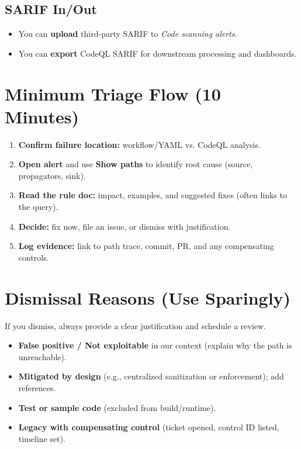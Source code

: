 \documentclass[11pt,letterpaper]{article}
\newcommand{\product}{CodeQL}
\begin{document}
\subsection{SARIF In/Out}
\begin{itemize}
  \item You can \textbf{upload} third-party SARIF to \textit{Code scanning alerts}.
  \item You can \textbf{export} \product{} SARIF for downstream processing and dashboards.
\end{itemize}

\section{Minimum Triage Flow (10 Minutes)}
\begin{enumerate}
  \item \textbf{Confirm failure location:} workflow/YAML vs. \product{} analysis.
  \item \textbf{Open alert} and use \textbf{Show paths} to identify root cause (source, propagators, sink).
  \item \textbf{Read the rule doc:} impact, examples, and suggested fixes (often links to the query).
  \item \textbf{Decide:} fix now, file an issue, or dismiss with justification.
  \item \textbf{Log evidence:} link to path trace, commit, PR, and any compensating controls.
\end{enumerate}

\section{Dismissal Reasons (Use Sparingly)}
If you dismiss, always provide a clear justification and schedule a review.
\begin{itemize}
  \item \textbf{False positive / Not exploitable} in our context (explain why the path is unreachable).
  \item \textbf{Mitigated by design} (e.g., centralized sanitization or enforcement); add references.
  \item \textbf{Test or sample code} (excluded from build/runtime).
  \item \textbf{Legacy with compensating control} (ticket opened, control ID listed, timeline set).
\end{itemize}
\end{document}
